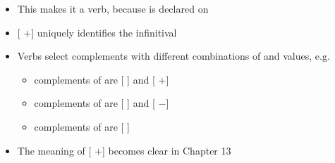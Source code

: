 \documentclass[a4paper,landscape,headrule,footrule]{foils}
\begin{document}
\begin{center}
  \begin{small}
  \end{small}
\end{center}

\begin{center}
\end{center}

\begin{itemize}\addtolength{\itemsep}{-1ex}
\item This makes it a verb, because  is declared on 
\item {[  $+$]} uniquely identifies the infinitival 
\item Verbs select complements with different combinations 
  of  and  values, e.g.
  \begin{itemize}
  \item complements of  are [ ] and [ $+$]
  \item complements of  are [ ] and [ $-$]
  \item complements of  are [ ]
  \end{itemize}
\item The meaning of [ $+$] becomes clear in Chapter 13
\end{itemize}
\end{document}
